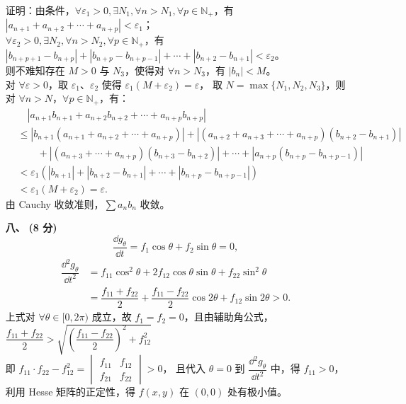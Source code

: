 \documentclass{ctexart}
\begin{document}
\begin{enumerate}
    证明：由条件，$\forall \varepsilon_1 > 0, \exists N_1, \forall n > N_1, \forall p \in \mathbb{N}_+$，有 $|a_{n+1} + a_{n+2} + \cdots + a_{n+p}| < \varepsilon_1$；\\
    $\forall \varepsilon_2 > 0, \exists N_2, \forall n > N_2, \forall p \in \mathbb{N}_+$，有 $|b_{n+p+1}-b_{n+p}|+|b_{n+p}-b_{n+p-1}|+\cdots+|b_{n+2}-b_{n+1}| < \varepsilon_2$。\\
    则不难知存在 $M>0$ 与 $N_3$，使得对 $\forall n > N_3$，有 $|b_{n}| < M$。\\
    对 $\forall\varepsilon > 0$，取 $\varepsilon_1$、$\varepsilon_2$ 使得 $\varepsilon_1(M+\varepsilon_2)=\varepsilon$，
    取 $N = \max\{N_1, N_2, N_3\}$，则对 $\forall n > N$，$\forall p \in \mathbb{N}_+$，有：
    \begin{align*}
    &\quad|a_{n+1}b_{n+1} + a_{n+2}b_{n+2} + \cdots + a_{n+p}b_{n+p}| \\
    &\leq |b_{n+1}(a_{n+1} + a_{n+2} + \cdots + a_{n+p})| + |(a_{n+2}+a_{n+3}+\cdots+a_{n+p})(b_{n+2} - b_{n+1})| \\
        &\quad\quad + |(a_{n+3}+\cdots+a_{n+p})(b_{n+3} - b_{n+2})| + \cdots + |a_{n+p}(b_{n+p} - b_{n+p-1})| \\
    &< \varepsilon_1(|b_{n+1}|+|b_{n+2}-b_{n+1}|+\cdots+|b_{n+p}-b_{n+p-1}|) \\
    &< \varepsilon_1(M+\varepsilon_2) = \varepsilon.
    \end{align*}
    由 Cauchy 收敛准则，$\sum a_n b_n$ 收敛。
    \item[\textbf{八、}] \textbf{(8 分)} $$ \dfrac{\dd{g_{\theta}}}{\dd{t}}=f_1\cos\theta+f_2\sin\theta=0, $$
    \begin{align*} 
    \dfrac{\dd{^2g_{\theta}}}{\dd{t^2}}&=f_{11}\cos^2\theta+2f_{12}\cos\theta\sin\theta+f_{22}\sin^2\theta \\
    &=\dfrac{f_{11}+f_{22}}{2}+\dfrac{f_{11}-f_{22}}{2}\cos 2\theta+f_{12}\sin 2\theta > 0.
    \end{align*}
    上式对 $\forall\theta\in [0,2\pi)$ 成立，故 $f_1=f_2=0$，且由辅助角公式，$\dfrac{f_{11}+f_{22}}{2}>\sqrt{(\dfrac{f_{11}-f_{22}}{2})^2+f_{12}^2}$ \\
    即 $f_{11}\cdot f_{22}-f_{12}^2=\begin{vmatrix} f_{11} & f_{12} \\ f_{21} & f_{22}\end{vmatrix}>0$，
    且代入 $\theta=0$ 到 $\dfrac{\dd{^2g_{\theta}}}{\dd{t^2}}$ 中，得 $f_{11}>0$， \\
    利用 Hesse 矩阵的正定性，得 $f(x,y)$ 在 $(0,0)$ 处有极小值。
\end{enumerate}
\end{document}
